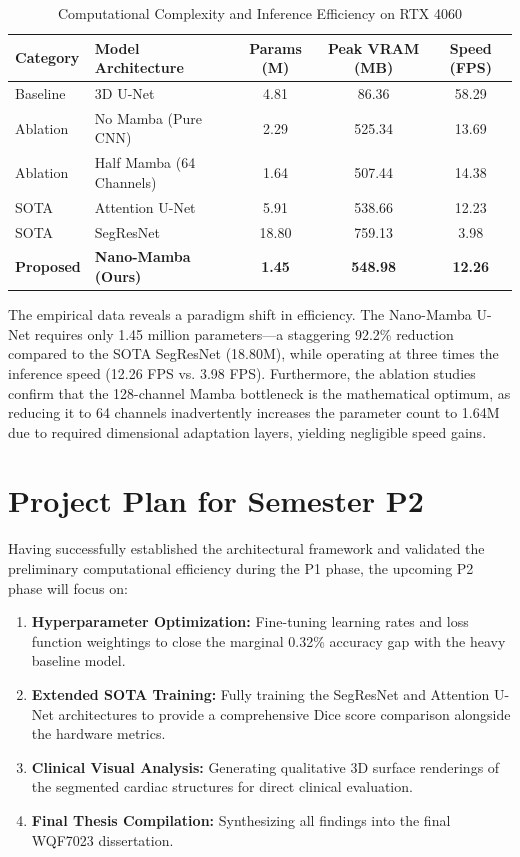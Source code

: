 \begin{table}[hbt!]
\caption{Computational Complexity and Inference Efficiency on RTX 4060}
\label{tab:complexity_results}
\centering
\begin{tabular}{l l c c c}
\hline
\textbf{Category} & \textbf{Model Architecture} & \textbf{Params (M)} & \textbf{Peak VRAM (MB)} & \textbf{Speed (FPS)}\\ 
\hline
Baseline & 3D U-Net & 4.81 & 86.36 & 58.29 \\
Ablation & No Mamba (Pure CNN) & 2.29 & 525.34 & 13.69 \\
Ablation & Half Mamba (64 Channels) & 1.64 & 507.44 & 14.38 \\
SOTA & Attention U-Net & 5.91 & 538.66 & 12.23 \\
SOTA & SegResNet & 18.80 & 759.13 & 3.98 \\
\hline
\textbf{Proposed} & \textbf{Nano-Mamba (Ours)} & \textbf{1.45} & \textbf{548.98} & \textbf{12.26} \\
\hline
\end{tabular}
\end{table}

The empirical data reveals a paradigm shift in efficiency. The Nano-Mamba U-Net requires only 1.45 million parameters—a staggering 92.2\% reduction compared to the SOTA SegResNet (18.80M), while operating at three times the inference speed (12.26 FPS vs. 3.98 FPS). Furthermore, the ablation studies confirm that the 128-channel Mamba bottleneck is the mathematical optimum, as reducing it to 64 channels inadvertently increases the parameter count to 1.64M due to required dimensional adaptation layers, yielding negligible speed gains.

\section{Project Plan for Semester P2}
Having successfully established the architectural framework and validated the preliminary computational efficiency during the P1 phase, the upcoming P2 phase will focus on:
\begin{enumerate}
    \item \textbf{Hyperparameter Optimization:} Fine-tuning learning rates and loss function weightings to close the marginal 0.32\% accuracy gap with the heavy baseline model.
    \item \textbf{Extended SOTA Training:} Fully training the SegResNet and Attention U-Net architectures to provide a comprehensive Dice score comparison alongside the hardware metrics.
    \item \textbf{Clinical Visual Analysis:} Generating qualitative 3D surface renderings of the segmented cardiac structures for direct clinical evaluation.
    \item \textbf{Final Thesis Compilation:} Synthesizing all findings into the final WQF7023 dissertation.
\end{enumerate}
